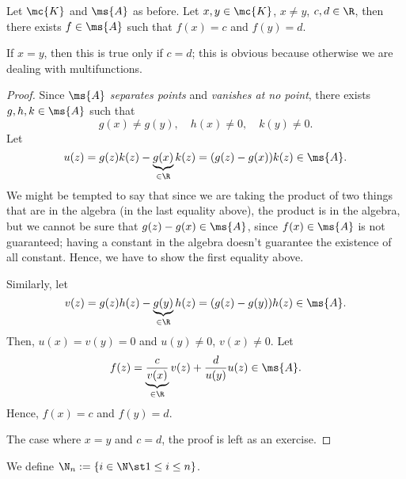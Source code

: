 \begin{lemma}
    Let \(\mc{K}\) and \(\ms{A}\) as before. Let \(x,y\in\mc{K}\), \(x\neq y\), \(c,d\in\R\), then there exists \(f\in\ms{A}\) such that \(f(x)=c\) and \(f(y)=d\).\label{lemma 3}
\end{lemma}
\begin{note}
    If \(x=y\), then this is true only if \(c=d\); this is obvious because otherwise we are dealing with multifunctions.
\end{note}
\begin{proof}
    Since \(\ms{A}\) \emph{separates points} and \emph{vanishes at no point}, there exists \(g,h,k\in\ms{A}\) such that 
    \begin{equation*} 
        g(x)\neq g(y),\quad h(x)\neq 0,\quad k(y)\neq 0.
    \end{equation*}
    Let
    \begin{equation*} 
        u(z)=g(z)k(z)-\underbrace{g(x)}_{\in\R}k(z)=(g(z)-g(x))k(z)\in\ms{A}.
    \end{equation*}
    We might be tempted to say that since we are taking the product of two things that are in the algebra (in the last equality above), the product is in the algebra, but we cannot be sure that \(g(z)-g(x)\in\ms{A}\), since \(f(x)\in\ms{A}\) is not guaranteed; having a constant in the algebra doesn't guarantee the existence of all constant. Hence, we have to show the first equality above.

    \medskip

    Similarly, let 
    \begin{equation*} 
        v(z)=g(z)h(z)-\underbrace{g(y)}_{\in\R}h(z)=(g(z)-g(y))h(z)\in\ms{A}.
    \end{equation*}
    Then, \(u(x)=v(y)=0\) and \(u(y)\neq 0\), \(v(x)\neq 0\). Let 
    \begin{equation*} 
        f(z)=\underbrace{\frac{c}{v(x)}}_{\in\R}v(z)+\frac{d}{u(y)}u(z)\in\ms{A}.
    \end{equation*}
    Hence, \(f(x)=c\) and \(f(y)=d\).

    \medskip

    The case where \(x=y\) and \(c=d\), the proof is left as an exercise.
\end{proof}

\begin{notation}
    We define \(\N_n:=\{i\in\N\st 1\leq i\leq n\}\).
\end{notation}

